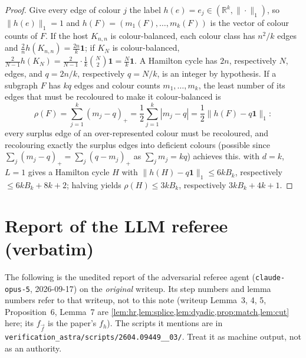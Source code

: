 \documentclass[11pt,a4paper]{article}
\theoremstyle{plain}
\theoremstyle{definition}
\theoremstyle{remark}
\newcommand{\R}{\mathbb R}
\newcommand{\vone}{\mathbf 1}
\begin{document}
\label{pf:recol}
\correcol*
\begin{proof}
Give every edge of colour $j$ the label $h(e)=e_j\in(\R^k,\|\cdot\|_1)$, so $\|h(e)\|_1=1$ and $h(F)=(m_1(F),\dots,m_k(F))$ is the vector of colour counts of $F$. If the host $K_{n,n}$ is colour-balanced, each colour class has $n^2/k$ edges and $\frac2nh(K_{n,n})=\frac{2n}k\vone$; if $K_N$ is colour-balanced, $\frac2{N-1}h(K_N)=\frac2{N-1}\cdot\frac1k\binom N2\vone=\frac Nk\vone$. A Hamilton cycle has $2n$, respectively $N$, edges, and $q=2n/k$, respectively $q=N/k$, is an integer by hypothesis. If a subgraph $F$ has $kq$ edges and colour counts $m_1,\dots,m_k$, the least number of its edges that must be recoloured to make it colour-balanced is
\[
 \rho(F)=\sum_{j=1}^k(m_j-q)_+=\frac12\sum_{j=1}^k|m_j-q|=\frac12\|h(F)-q\vone\|_1 :
\]
every surplus edge of an over-represented colour must be recoloured, and recolouring exactly the surplus edges into deficient colours (possible since $\sum_j(m_j-q)_+=\sum_j(q-m_j)_+$ as $\sum_jm_j=kq$) achieves this.  with $d=k$, $L=1$ gives a Hamilton cycle $H$ with $\|h(H)-q\vone\|_1\le6kB_k$, respectively $\le6kB_k+8k+2$; halving yields $\rho(H)\le3kB_k$, respectively $3kB_k+4k+1$.
\end{proof}

\section{Report of the LLM referee (verbatim)}\label{app:referee}

\begin{tcolorbox}[colback=gray!8,colframe=gray!50,boxrule=0.4pt,arc=2pt]
\small The following is the unedited report of the adversarial referee agent (\texttt{claude-opus-5}, 2026-09-17) on the \emph{original} writeup. Its step numbers and lemma numbers refer to that writeup, not to this note (writeup Lemma~3, 4, 5, Proposition~6, Lemma~7 are \cref{lem:hr,lem:splice,lem:dyadic,prop:match,lem:cut} here; its $f_{\vec f}$ is the paper's $f_h$). The scripts it mentions are in \nolinkurl{verification_astra/scripts/2604.09449__03/}. Treat it as machine output, not as an authority.
\end{tcolorbox}


\end{document}
